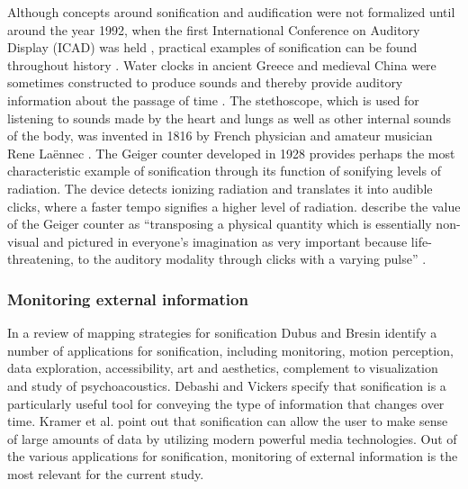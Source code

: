 \documentclass[10pt,a4paper,onecolumn]{article}
\begin{document}
Although concepts around sonification and audification were not formalized until around the year 1992, when the first International Conference on Auditory Display (ICAD) was held \autocite{dubusSonificationPhysicalQuantities2011}, practical examples of sonification can be found throughout history \autocite{dubusInteractiveSonificationMotion2013}. Water clocks in ancient Greece and medieval China were sometimes constructed to produce sounds and thereby provide auditory information about the passage of time \autocite{dubusSonificationPhysicalQuantities2011}. The stethoscope, which is used for listening to sounds made by the heart and lungs as well as other internal sounds of the body, was invented in 1816 by French physician and amateur musician Rene Laënnec \autocite{roguinReneTheophileHyacinthe2006}. The Geiger counter developed in 1928 provides perhaps the most characteristic example of sonification through its function of sonifying levels of radiation. The device detects ionizing radiation and translates it into audible clicks, where a faster tempo signifies a higher level of radiation. \textcite{dubusSonificationPhysicalQuantities2011} describe the value of the Geiger counter as ``transposing a physical quantity which is essentially non-visual and pictured in everyone's imagination as very important because life-threatening, to the auditory modality through clicks with a varying pulse'' \autocite[p.~1]{dubusSonificationPhysicalQuantities2011}.

\hypertarget{monitoring-external-information}{%
\subsubsection{Monitoring external information}\label{monitoring-external-information}}

In a review of mapping strategies for sonification Dubus and Bresin \autocite{dubusSystematicReviewMapping2013} identify a number of applications for sonification, including monitoring, motion perception, data exploration, accessibility, art and aesthetics, complement to visualization and study of psychoacoustics. Debashi and Vickers \autocite{debashiSonificationNetworkTraffic2018} specify that sonification is a particularly useful tool for conveying the type of information that changes over time. Kramer et al. \autocite{kramerSonificationReportStatus1999} point out that sonification can allow the user to make sense of large amounts of data by utilizing modern powerful media technologies. Out of the various applications for sonification, monitoring of external information is the most relevant for the current study.
\end{document}

